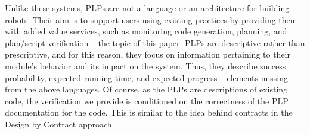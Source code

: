 \documentclass[letterpaper]{article}
\begin{document}
{%
%
%
%
Unlike these systems, PLPs are not a language or an architecture for building robots.
Their aim is to support users using existing practices
by providing them with added value services, such as monitoring code generation, planning, and plan/script verification -- the topic
of this paper. PLPs are descriptive rather than prescriptive, and for this reason, they focus on information pertaining to their module's behavior and its impact
on the system. Thus, they describe success probability, expected running time, and expected progress -- elements missing from the above languages. Of course, as the PLPs are descriptions of existing code,
the verification we provide is conditioned on the correctness of the PLP documentation for the code.
This is similar to the idea behind contracts in the Design by Contract approach~\citep{Eiffel}.

}
\end{document}
